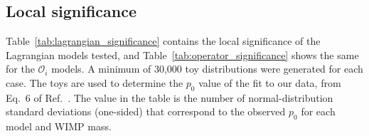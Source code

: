 \subsection{Local significance}
Table~\ref{tab:lagrangian_significance} contains the local significance of the Lagrangian models tested, and Table~\ref{tab:operator_significance} shows the same for the $\mathcal{O}_i$ models.
A minimum of 30,000 toy distributions were generated for each case.
The toys are used to determine the $p_0$ value of the fit to our data, from Eq.~6 of Ref.~\cite{DM_parameters:BAXTER2021_Conventions}.  The value in the table is the number of normal-distribution standard deviations (one-sided) that correspond to the observed $p_0$ for each model and WIMP mass.

